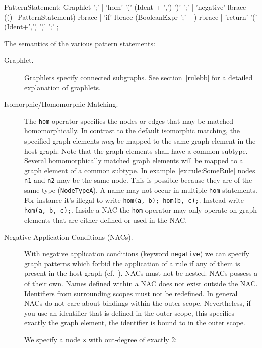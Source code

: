 \begin{rail}  
  PatternStatement: 
    Graphlet ';' |
    'hom' '(' (Ident + ',') ')' ';' |
    'negative' lbrace (()+PatternStatement) rbrace |
    'if' lbrace (BooleanExpr ';' +) rbrace |
    'return' '(' (Ident+',') ')' ';' ;
\end{rail}
The semantics of the various pattern statements:
\begin{description}
  \item[Graphlet.] Graphlets specify connected subgraphs. See section~\ref{rulebb} for a detailed explanation of graphlets. 
  \item[Isomorphic/Homomorphic Matching.] The \texttt{hom} operator specifies the nodes or edges that may be matched homomorphically. 
  In contrast to the default isomorphic matching, the specified graph elements \emph{may} be mapped to the same graph element in the host graph. Note that the graph elements shall have a common subtype. 
  Several homomorphically matched graph elements will be mapped to a graph element of a common subtype.
  In example~\ref{ex:rule:SomeRule} nodes \texttt{n1} and \texttt{n2} may be the same node. This is possible because they are of the same type (\texttt{NodeTypeA}).
  A name may not occur in multiple \texttt{hom} statements. 
  For instance it's illegal to write \texttt{hom(a, b); hom(b, c);}. Instead write \texttt{hom(a, b, c);}. 
  Inside a NAC the \texttt{hom} operator may only operate on graph elements that are either defined or used in the NAC.
  \item[Negative Application Conditions (NACs).] With negative application conditions (keyword \texttt{negative}) we can specify graph patterns which forbid the application of a rule if any of them is present in the host graph (cf.~\cite{adam}). 
  NACs must not be nested.
  NACs possess a  of their own. 
  Names defined within a NAC does not exist outside the NAC. 
  Identifiers from surrounding scopes must not be redefined.
  In general NACs do not care about bindings within the outer scope. 
  Nevertheless, if you use an identifier that is defined in the outer scope, this specifies exactly the graph element, the identifier is bound to in the outer scope.
  \begin{example}
    We specify a node \texttt{x} with out-degree of exactly 2:

\end{example}
\end{description}
